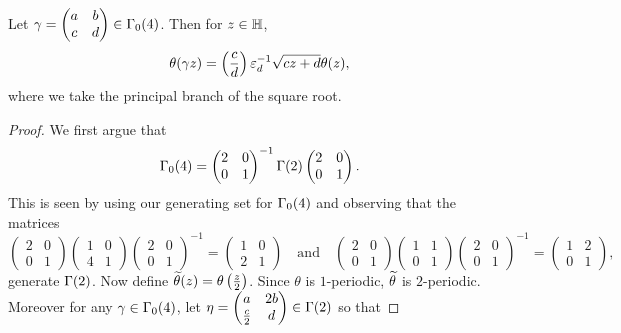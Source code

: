 \documentclass[12pt,oneside]{book}
\begin{document}
      \begin{proposition}
        Let $\gamma = \begin{pmatrix} a & b \\ c & d \end{pmatrix} \in \Gamma_{0}(4)$. Then for $z \in \mathbb{H}$,
        \[
          \theta(\gamma z) = \left(\frac{c}{d}\right)\varepsilon_{d}^{-1}\sqrt{cz+d}\theta(z),
        \]
        where we take the principal branch of the square root.
      \end{proposition}
      \begin{proof}
        We first argue that
        \[
          \Gamma_{0}(4) = \begin{pmatrix} 2 & 0 \\ 0 & 1 \end{pmatrix}^{-1} \Gamma(2) \begin{pmatrix} 2 & 0 \\ 0 & 1 \end{pmatrix}.
        \]
        This is seen by using our generating set for $\Gamma_{0}(4)$ and observing that the matrices
        \[
          \begin{pmatrix} 2 & 0 \\ 0 & 1 \end{pmatrix} \begin{pmatrix} 1 & 0 \\ 4 & 1 \end{pmatrix} \begin{pmatrix} 2 & 0 \\ 0 & 1 \end{pmatrix}^{-1} = \begin{pmatrix} 1 & 0 \\ 2 & 1 \end{pmatrix} \quad \text{and} \quad \begin{pmatrix} 2 & 0 \\ 0 & 1 \end{pmatrix} \begin{pmatrix} 1 & 1 \\ 0 & 1 \end{pmatrix} \begin{pmatrix} 2 & 0 \\ 0 & 1 \end{pmatrix}^{-1} = \begin{pmatrix} 1 & 2 \\ 0 & 1 \end{pmatrix},
        \]
        generate $\Gamma(2)$. Now define $\widetilde{\theta}(z) = \theta\left(\frac{z}{2}\right)$. Since $\theta$ is $1$-periodic, $\widetilde{\theta}$ is $2$-periodic. Moreover for any $\gamma \in \Gamma_{0}(4)$, let $\eta = \begin{pmatrix} a & 2b \\ \frac{c}{2} & d\end{pmatrix} \in \Gamma(2)$ so that

\end{proof}
\end{document}
